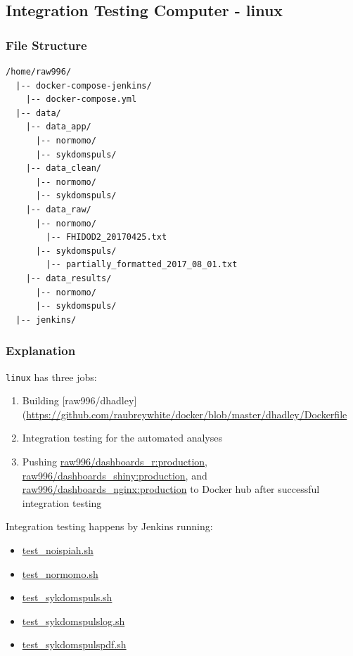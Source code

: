 \documentclass[12pt,]{article}
\providecommand{\tightlist}{%
  \setlength{\itemsep}{0pt}\setlength{\parskip}{0pt}}
\begin{document}
\hypertarget{integrationtesting}{\subsection{Integration Testing
Computer - linux}\label{integrationtesting}}

\subsubsection{File Structure}\label{file-structure-1}

\begin{verbatim}
/home/raw996/
  |-- docker-compose-jenkins/
    |-- docker-compose.yml
  |-- data/
    |-- data_app/
      |-- normomo/
      |-- sykdomspuls/
    |-- data_clean/
      |-- normomo/
      |-- sykdomspuls/
    |-- data_raw/
      |-- normomo/
        |-- FHIDOD2_20170425.txt
      |-- sykdomspuls/
        |-- partially_formatted_2017_08_01.txt
    |-- data_results/
      |-- normomo/
      |-- sykdomspuls/
  |-- jenkins/
\end{verbatim}

\subsubsection{Explanation}\label{explanation-1}

\texttt{linux} has three jobs:

\begin{enumerate}
\def\labelenumi{\arabic{enumi}.}
\tightlist
\item
  Building
  {[}raw996/dhadley{]}(\url{https://github.com/raubreywhite/docker/blob/master/dhadley/Dockerfile}
\item
  Integration testing for the automated analyses
\item
  Pushing
  \href{https://hub.docker.com/r/raw996/dashboards_r/}{raw996/dashboards\_r:production},
  \href{https://hub.docker.com/r/raw996/dashboards_shiny/}{raw996/dashboards\_shiny:production},
  and
  \href{https://hub.docker.com/r/raw996/dashboards_nginx/}{raw996/dashboards\_nginx:production}
  to Docker hub after successful integration testing
\end{enumerate}

Integration testing happens by Jenkins running:

\begin{itemize}
\tightlist
\item
  \href{https://github.com/raubreywhite/dashboards_control/blob/master/bin/test_noispiah.sh}{test\_noispiah.sh}
\item
  \href{https://github.com/raubreywhite/dashboards_control/blob/master/bin/test_normomo.sh}{test\_normomo.sh}
\item
  \href{https://github.com/raubreywhite/dashboards_control/blob/master/bin/test_sykdomspuls.sh}{test\_sykdomspuls.sh}
\item
  \href{https://github.com/raubreywhite/dashboards_control/blob/master/bin/test_sykdomspulslog.sh}{test\_sykdomspulslog.sh}
\item
  \href{https://github.com/raubreywhite/dashboards_control/blob/master/bin/test_sykdomspulspdf.sh}{test\_sykdomspulspdf.sh}
\end{itemize}
\end{document}
